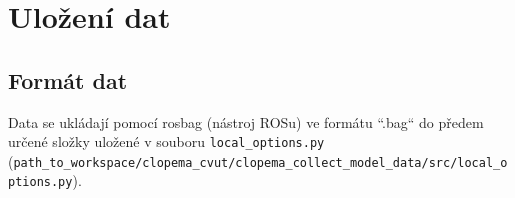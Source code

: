 \documentclass[10pt,a4paper,titlepage,oneside]{report}
\begin{document}

\chapter{Uložení dat}

\section{Formát dat}
Data se ukládají pomocí rosbag (nástroj ROSu) ve formátu “.bag“ do předem určené složky uložené v souboru \verb|local_options.py|\\ (\verb|path_to_workspace/clopema_cvut/clopema_collect_model_data/src/local_options.py|).
\\
\end{document}
